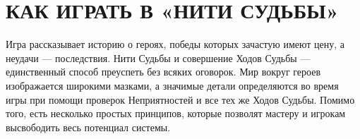 \section*{КАК ИГРАТЬ В «НИТИ СУДЬБЫ»}


Игра рассказывает историю о героях, победы которых зачастую имеют цену, а неудачи — последствия. Нити Судьбы и совершение Ходов Судьбы — единственный способ преуспеть без всяких оговорок. Мир вокруг героев изображается широкими мазками, а значимые детали определяются во время игры при помощи проверок Неприятностей и все тех же Ходов Судьбы. Помимо того, есть несколько простых принципов, которые позволят мастеру и игрокам высвободить весь потенциал системы.